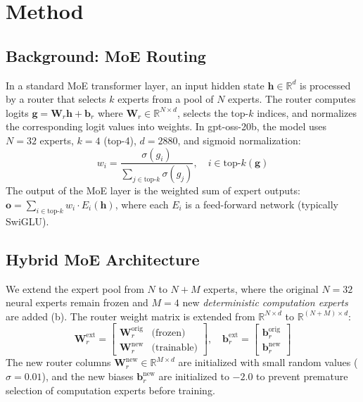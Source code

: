 \section{Method}
\label{sec:method}



\subsection{Background: MoE Routing}
\label{sec:method:background}

In a standard MoE transformer layer, an input hidden state
$\mathbf{h} \in \mathbb{R}^d$ is processed by a router that selects
$k$ experts from a pool of $N$ experts. The router computes logits
$\mathbf{g} = \mathbf{W}_r \mathbf{h} + \mathbf{b}_r$ where
$\mathbf{W}_r \in \mathbb{R}^{N \times d}$, selects the top-$k$
indices, and normalizes the corresponding logit values into weights.
In gpt-oss-20b, the model uses $N{=}32$ experts, $k{=}4$ (top-4),
$d{=}2880$, and sigmoid normalization:
\begin{equation}
    w_i = \frac{\sigma(g_i)}{\sum_{j \in \text{top-}k} \sigma(g_j)},
    \quad i \in \text{top-}k(\mathbf{g})
\label{eq:routing}
\end{equation}
The output of the MoE layer is the weighted sum of expert outputs:
$\mathbf{o} = \sum_{i \in \text{top-}k} w_i \cdot E_i(\mathbf{h})$,
where each $E_i$ is a feed-forward network (typically SwiGLU).

\subsection{Hybrid MoE Architecture}
\label{sec:method:arch}

We extend the expert pool from $N$ to $N + M$ experts, where the
original $N{=}32$ neural experts remain frozen and $M{=}4$ new
\emph{deterministic computation experts} are added
(b). The router weight
matrix is extended from $\mathbb{R}^{N \times d}$ to
$\mathbb{R}^{(N+M) \times d}$:
\begin{equation}
    \mathbf{W}_r^{\text{ext}} =
    \begin{bmatrix}
        \mathbf{W}_r^{\text{orig}} & \text{(frozen)} \\
        \mathbf{W}_r^{\text{new}} & \text{(trainable)}
    \end{bmatrix},
    \quad
    \mathbf{b}_r^{\text{ext}} =
    \begin{bmatrix}
        \mathbf{b}_r^{\text{orig}} \\
        \mathbf{b}_r^{\text{new}}
    \end{bmatrix}
\label{eq:extended_router}
\end{equation}
The new router columns $\mathbf{W}_r^{\text{new}} \in \mathbb{R}^{M \times d}$
are initialized with small random values ($\sigma{=}0.01$), and the new
biases $\mathbf{b}_r^{\text{new}}$ are initialized to $-2.0$ to prevent
premature selection of computation experts before training.

